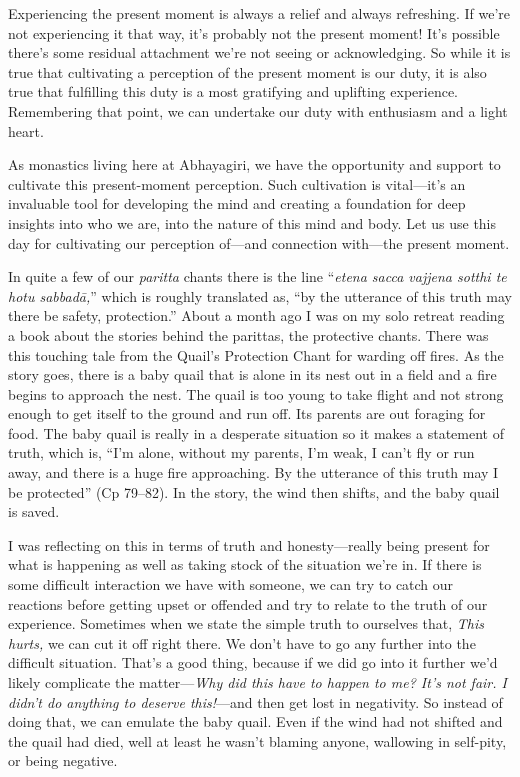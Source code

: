Experiencing the present moment is always a relief and always 
refreshing. If we're not experiencing it that way, it's probably not 
the present moment! It's possible there's some residual attachment 
we're not seeing or acknowledging. So while it is true that cultivating 
a perception of the present moment is our duty, it is also true that 
fulfilling this duty is a most gratifying and uplifting experience. 
Remembering that point, we can undertake our duty with enthusiasm and a 
light heart.

As monastics living here at Abhayagiri, we have the opportunity and 
support to cultivate this present-moment perception. Such cultivation 
is vital---it's an invaluable tool for developing the mind and creating 
a foundation for deep insights into who we are, into the nature of this 
mind and body. Let us use this day for cultivating our perception 
of---and connection with---the present moment.


In quite a few of our \emph{paritta} chants there is the line 
``\emph{etena sacca vajjena sotthi te hotu sabbadā,}'' which is 
roughly translated as, ``by the utterance of this truth may there be 
safety, protection.'' About a month ago I was on my solo retreat 
reading a book about the stories behind the parittas, the protective 
chants. There was this touching tale from the Quail's Protection Chant 
for warding off fires. As the story goes, there is a baby quail that is 
alone in its nest out in a field and a fire begins to approach the 
nest. The quail is too young to take flight and not strong enough to 
get itself to the ground and run off. Its parents are out foraging for 
food. The baby quail is really in a desperate situation so it makes a 
statement of truth, which is, ``I'm alone, without my parents, I'm 
weak, I can't fly or run away, and there is a huge fire approaching. By 
the utterance of this truth may I be protected'' (Cp 79–82). In the 
story, the wind then shifts, and the baby quail is saved.

I was reflecting on this in terms of truth and honesty---really being 
present for what is happening as well as taking stock of the situation 
we're in. If there is some difficult interaction we have with someone, 
we can try to catch our reactions before getting upset or offended and 
try to relate to the truth of our experience. Sometimes when we state 
the simple truth to ourselves that, \emph{This hurts,} we can cut it 
off right there. We don't have to go any further into the difficult 
situation. That's a good thing, because if we did go into it further 
we'd likely complicate the matter---\emph{Why did this have to happen 
to me? It's not fair. I didn't do anything to deserve this!}---and then 
get lost in negativity. So instead of doing that, we can emulate the 
baby quail. Even if the wind had not shifted and the quail had died, 
well at least he wasn't blaming anyone, wallowing in self-pity, or 
being negative.

